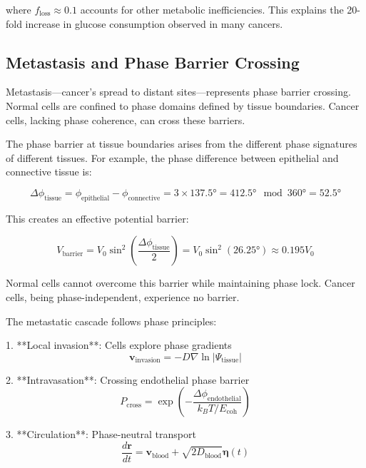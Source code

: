 \documentclass[12pt,a4paper]{report}
\begin{document}
where $f_{\text{loss}} \approx 0.1$ accounts for other metabolic inefficiencies. This explains the 20-fold increase in glucose consumption observed in many cancers.

\subsection{Metastasis and Phase Barrier Crossing}

Metastasis—cancer's spread to distant sites—represents phase barrier crossing. Normal cells are confined to phase domains defined by tissue boundaries. Cancer cells, lacking phase coherence, can cross these barriers.

The phase barrier at tissue boundaries arises from the different phase signatures of different tissues. For example, the phase difference between epithelial and connective tissue is:

\begin{equation}
\Delta\phi_{\text{tissue}} = \phi_{\text{epithelial}} - \phi_{\text{connective}} = 3 \times 137.5° = 412.5° \mod 360° = 52.5°
\end{equation}

This creates an effective potential barrier:

\begin{equation}
V_{\text{barrier}} = V_0 \sin^2\left(\frac{\Delta\phi_{\text{tissue}}}{2}\right) = V_0 \sin^2(26.25°) \approx 0.195 V_0
\end{equation}

Normal cells cannot overcome this barrier while maintaining phase lock. Cancer cells, being phase-independent, experience no barrier.

The metastatic cascade follows phase principles:

1. **Local invasion**: Cells explore phase gradients
   \begin{equation}
   \mathbf{v}_{\text{invasion}} = -D \nabla \ln |\Psi_{\text{tissue}}|
   \end{equation}

2. **Intravasation**: Crossing endothelial phase barrier
   \begin{equation}
   P_{\text{cross}} = \exp\left(-\frac{\Delta\phi_{\text{endothelial}}}{k_B T/E_{\text{coh}}}\right)
   \end{equation}

3. **Circulation**: Phase-neutral transport
   \begin{equation}
   \frac{d\mathbf{r}}{dt} = \mathbf{v}_{\text{blood}} + \sqrt{2D_{\text{blood}}} \boldsymbol{\eta}(t)
   \end{equation}
\end{document}
